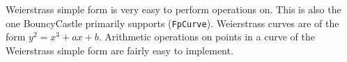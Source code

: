 Weierstrass simple form is very easy to perform operations on. This is also the one
BouncyCastle primarily supports (\verb|FpCurve|). Weierstrass curves are of the form
\(y^2 = x^3 + ax + b\). Arithmetic operations on points in a curve of the Weierstrass
simple form are fairly easy to implement.